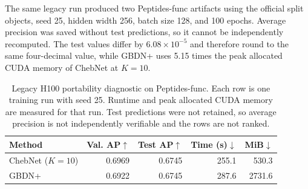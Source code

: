 The same legacy run produced two Peptides-func artifacts using the official
split objects, seed 25, hidden width 256, batch size 128, and 100 epochs.
Average precision was saved without test predictions, so it cannot be
independently recomputed.  The test values differ by $6.08\times10^{-5}$ and
therefore round to the same four-decimal value, while GBDN+ uses 5.15 times the
peak allocated CUDA memory of ChebNet at $K=10$.

\begin{table}[t]
\centering
\small
\setlength{\tabcolsep}{4.5pt}
\caption{Legacy H100 portability diagnostic on Peptides-func.  Each row is one
training run with seed 25.  Runtime and peak allocated CUDA memory are measured
for that run.  Test predictions were not retained, so average precision is not
independently verifiable and the rows are not ranked.}
\label{tab:legacy-lrgb}
\begin{tabular}{lrrrr}
\toprule
Method & Val. AP$\uparrow$ & Test AP$\uparrow$ & Time (s)$\downarrow$ & MiB$\downarrow$ \\
\midrule
ChebNet ($K=10$) & 0.6969 & 0.6745 & 255.1 & 530.3 \\
GBDN+             & 0.6922 & 0.6745 & 287.6 & 2731.6 \\
\bottomrule
\end{tabular}
\end{table}
